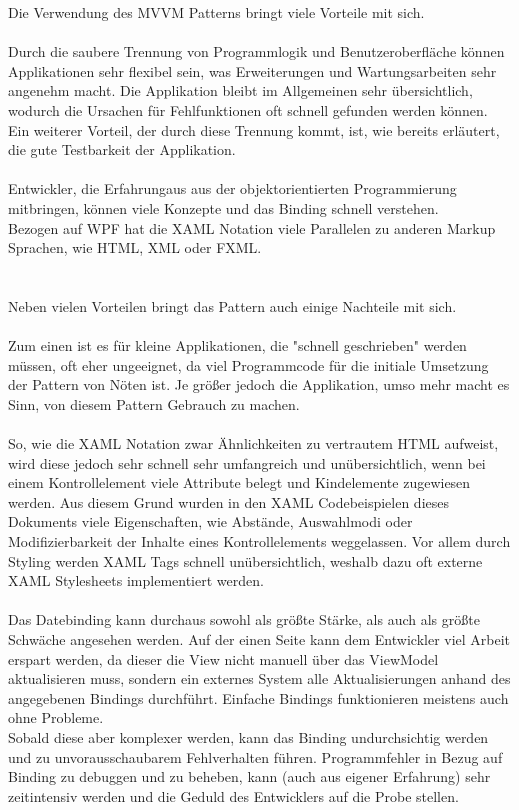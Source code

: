 \documentclass[titlepage=false,12pt]{scrreprt}
\begin{document}
Die Verwendung des MVVM Patterns bringt viele Vorteile mit sich.\\
\\
\noindent
Durch die saubere Trennung von Programmlogik und Benutzeroberfläche können Applikationen sehr flexibel sein,
was Erweiterungen und Wartungsarbeiten sehr angenehm macht. Die Applikation bleibt im Allgemeinen sehr übersichtlich, wodurch
die Ursachen für Fehlfunktionen oft schnell gefunden werden können.\\
Ein weiterer Vorteil, der durch diese Trennung kommt, ist, wie bereits erläutert, die gute Testbarkeit der Applikation.\\
\\
\noindent
Entwickler, die Erfahrungaus aus der objektorientierten Programmierung mitbringen, können viele Konzepte und das Binding schnell verstehen.\\
Bezogen auf WPF hat die XAML Notation viele Parallelen zu anderen Markup Sprachen, wie HTML, XML oder FXML.\\
\\
\\
\noindent
Neben vielen Vorteilen bringt das Pattern auch einige Nachteile mit sich.\\
\\
\noindent
Zum einen ist es für kleine Applikationen, die "schnell geschrieben" werden müssen, oft eher ungeeignet, da viel Programmcode für die initiale
Umsetzung der Pattern von Nöten ist. Je größer jedoch die Applikation, umso mehr macht es Sinn, von diesem Pattern Gebrauch zu machen.\\
\\
\noindent
So, wie die XAML Notation zwar Ähnlichkeiten zu vertrautem HTML aufweist, wird diese jedoch sehr schnell sehr umfangreich und unübersichtlich,
wenn bei einem Kontrollelement viele Attribute belegt und Kindelemente zugewiesen werden. Aus diesem Grund wurden in den XAML Codebeispielen
dieses Dokuments viele Eigenschaften, wie Abstände, Auswahlmodi oder Modifizierbarkeit der Inhalte eines Kontrollelements weggelassen.
Vor allem durch Styling werden XAML Tags schnell unübersichtlich, weshalb dazu oft externe XAML Stylesheets implementiert werden.\\
\\
\noindent
Das Datebinding kann durchaus sowohl als größte Stärke, als auch als größte Schwäche angesehen werden. Auf der einen Seite kann dem Entwickler viel
Arbeit erspart werden, da dieser die View nicht manuell über das ViewModel aktualisieren muss, sondern ein externes System alle Aktualisierungen
anhand des angegebenen Bindings durchführt. Einfache Bindings funktionieren meistens auch ohne Probleme.\\
Sobald diese aber komplexer werden, kann das Binding undurchsichtig werden und zu unvorausschaubarem Fehlverhalten führen. Programmfehler
in Bezug auf Binding zu debuggen und zu beheben, kann (auch aus eigener Erfahrung) sehr zeitintensiv werden und die Geduld des Entwicklers auf die Probe stellen.
\end{document}
